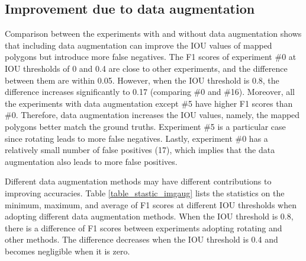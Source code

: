 \documentclass[preprint,12pt,authoryear]{elsarticle}
\begin{document}
\subsection{Improvement due to data augmentation}
\label{subsec_contrib_dataAug}

Comparison between the experiments with and without data augmentation shows that including data augmentation can improve the IOU values of mapped polygons but introduce more false negatives. The F1 scores of experiment \#0 at IOU thresholds of 0 and 0.4 are close to other experiments, and the difference between them are within 0.05. 
However, when the IOU threshold is 0.8, the difference increases significantly to 0.17 (comparing \#0 and \#16). Moreover, all the experiments with data augmentation except \#5 have higher F1 scores than \#0. Therefore, data augmentation increases the IOU values, namely, the mapped polygons better match the ground truths. Experiment \#5 is a particular case since rotating leads to more false negatives. 
Lastly, experiment \#0 has a relatively small number of false positives (17), which implies that the data augmentation also leads to more false positives. 


Different data augmentation methods may have different contributions to improving accuracies. Table \ref{table_stastic_imgaug} lists the statistics on the minimum, maximum, and average of F1 scores at different IOU thresholds when adopting different data augmentation methods. 
When the IOU threshold is 0.8, there is a difference of F1 scores between experiments adopting rotating and other methods. The difference decreases when the IOU threshold is 0.4 and becomes negligible when it is zero. 
\end{document}
